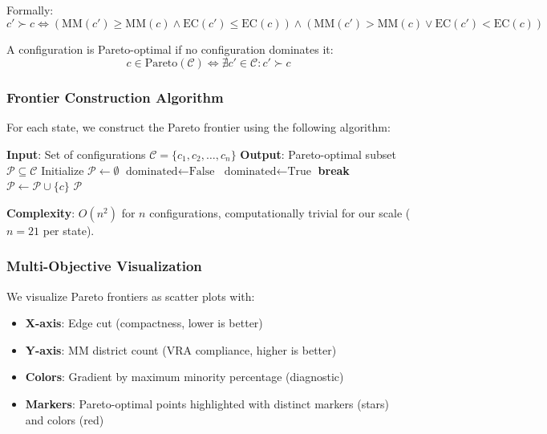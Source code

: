 Formally:
\[
c' \succ c \iff \left( \text{MM}(c') \geq \text{MM}(c) \land \text{EC}(c') \leq \text{EC}(c) \right) \land \left( \text{MM}(c') > \text{MM}(c) \lor \text{EC}(c') < \text{EC}(c) \right)
\]

A configuration is Pareto-optimal if no configuration dominates it:
\[
c \in \text{Pareto}(\mathcal{C}) \iff \nexists c' \in \mathcal{C} : c' \succ c
\]

\subsubsection{Frontier Construction Algorithm}

For each state, we construct the Pareto frontier using the following algorithm:

\begin{algorithm}[H]
\caption{Pareto Frontier Identification}
\begin{algorithmic}[1]
\STATE \textbf{Input}: Set of configurations $\mathcal{C} = \{c_1, c_2, \ldots, c_n\}$
\STATE \textbf{Output}: Pareto-optimal subset $\mathcal{P} \subseteq \mathcal{C}$
\STATE Initialize $\mathcal{P} \gets \emptyset$
    \STATE $\text{dominated} \gets \text{False}$
         
            \STATE $\text{dominated} \gets \text{True}$
            \STATE \textbf{break}
        \ENDIF
    \ENDFOR
        \STATE $\mathcal{P} \gets \mathcal{P} \cup \{c\}$
    \ENDIF
\ENDFOR
\RETURN $\mathcal{P}$
\end{algorithmic}
\end{algorithm}

\textbf{Complexity}: $O(n^2)$ for $n$ configurations, computationally trivial for our scale ($n = 21$ per state).

\subsubsection{Multi-Objective Visualization}

We visualize Pareto frontiers as scatter plots with:
\begin{itemize}
    \item \textbf{X-axis}: Edge cut (compactness, lower is better)
    \item \textbf{Y-axis}: MM district count (VRA compliance, higher is better)
    \item \textbf{Colors}: Gradient by maximum minority percentage (diagnostic)
    \item \textbf{Markers}: Pareto-optimal points highlighted with distinct markers (stars) and colors (red)
\end{itemize}

